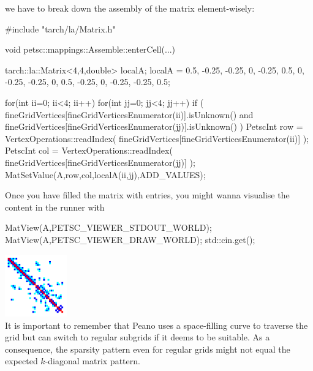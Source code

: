 \noindent
we have to break down the assembly of the matrix element-wisely:

\begin{code}
#include "tarch/la/Matrix.h"

void petsc::mappings::Assemble::enterCell(...) {
 tarch::la::Matrix<4,4,double> localA;
 localA =   0.5,  -0.25, -0.25,  0,
          -0.25,    0.5,     0, -0.25,
          -0.25,      0,   0.5, -0.25,
              0,  -0.25, -0.25,  0.5;

 for(int ii=0; ii<4; ii++)
 for(int jj=0; jj<4; jj++) {
  if (
   fineGridVertices[fineGridVerticesEnumerator(ii)].isUnknown()
   and
   fineGridVertices[fineGridVerticesEnumerator(jj)].isUnknown()
  ) {
   PetscInt row = VertexOperations::readIndex( 
     fineGridVertices[fineGridVerticesEnumerator(ii)] );
   PetscInt col = VertexOperations::readIndex( 
     fineGridVertices[fineGridVerticesEnumerator(jj)] );
   MatSetValue(A,row,col,localA(ii,jj),ADD_VALUES);
  }
 }
}
\end{code}

\noindent
Once you have filled the matrix with entries, you might wanna visualise the
content in the runner with
\begin{code}
  MatView(A,PETSC_VIEWER_STDOUT_WORLD);
  MatView(A,PETSC_VIEWER_DRAW_WORLD);
  std::cin.get();
\end{code}

\begin{center}
  \includegraphics[width=0.2\textwidth]{43_dg/matrix-pattern.png}
  \\
  {
  \footnotesize
  It is important to remember that Peano uses a space-filling curve to traverse
  the grid but can switch to regular subgrids if it deems to be suitable. As a
  consequence, the sparsity pattern even for regular grids might not equal the
  expected $k$-diagonal matrix pattern.
  }
\end{center}


